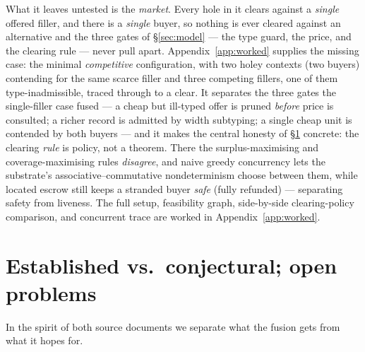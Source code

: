 \documentclass[11pt]{article}
\theoremstyle{definition}
\begin{document}
What it leaves untested is the \emph{market}. Every hole in it clears against a \emph{single} offered
filler, and there is a \emph{single} buyer, so nothing is ever cleared against an alternative and the
three gates of \S\ref{sec:model} --- the type guard, the price, and the clearing rule --- never pull
apart. Appendix~\ref{app:worked} supplies the missing case: the minimal \emph{competitive}
configuration, with two holey contexts (two buyers) contending for the same scarce filler and three
competing fillers, one of them type-inadmissible, traced through to a clear. It separates the three
gates the single-filler case fused --- a cheap but ill-typed offer is pruned \emph{before} price is
consulted; a richer record is admitted by width subtyping; a single cheap unit is contended by both
buyers --- and it makes the central honesty of \S\ref{sec:open} concrete: the clearing \emph{rule} is
policy, not a theorem. There the surplus-maximising and coverage-maximising rules \emph{disagree}, and
naive greedy concurrency lets the substrate's associative--commutative nondeterminism choose between
them, while located escrow still keeps a stranded buyer \emph{safe} (fully refunded) --- separating
safety from liveness. The full setup, feasibility graph, side-by-side clearing-policy comparison, and
concurrent trace are worked in Appendix~\ref{app:worked}.

\section{Established vs.\ conjectural; open problems}\label{sec:open}
In the spirit of both source documents we separate what the fusion gets from what it hopes for.
\end{document}
